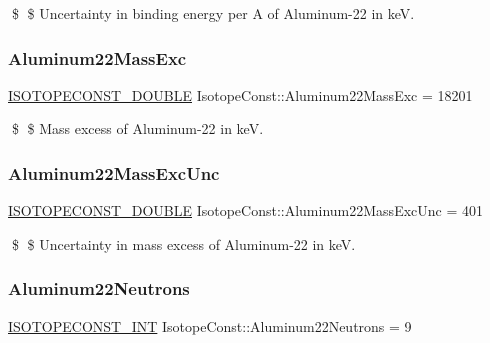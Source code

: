 \$ \$ Uncertainty in binding energy per A of Aluminum-\/22 in keV. \mbox{\label{group___isotope_const-_aluminum-_al22_gac7ff9cd15272c76971142484cd2c50c3}} 
\subsubsection{\texorpdfstring{Aluminum22\+Mass\+Exc}{Aluminum22MassExc}}
{\footnotesize\ttfamily \mbox{\hyperlink{group___isotope_const-_macros_ga8f45a7272ce02c0b4c65c44636ed719a}{I\+S\+O\+T\+O\+P\+E\+C\+O\+N\+S\+T\+\_\+\+D\+O\+U\+B\+LE}} Isotope\+Const\+::\+Aluminum22\+Mass\+Exc = 18201}

\$ \$ Mass excess of Aluminum-\/22 in keV. \mbox{\label{group___isotope_const-_aluminum-_al22_ga56b96e058b9d9135a37dee562cecb729}} 
\subsubsection{\texorpdfstring{Aluminum22\+Mass\+Exc\+Unc}{Aluminum22MassExcUnc}}
{\footnotesize\ttfamily \mbox{\hyperlink{group___isotope_const-_macros_ga8f45a7272ce02c0b4c65c44636ed719a}{I\+S\+O\+T\+O\+P\+E\+C\+O\+N\+S\+T\+\_\+\+D\+O\+U\+B\+LE}} Isotope\+Const\+::\+Aluminum22\+Mass\+Exc\+Unc = 401}

\$ \$ Uncertainty in mass excess of Aluminum-\/22 in keV. \mbox{\label{group___isotope_const-_aluminum-_al22_ga5ed4843eaf0eff6fdc95169f214cbafd}} 
\subsubsection{\texorpdfstring{Aluminum22\+Neutrons}{Aluminum22Neutrons}}
{\footnotesize\ttfamily \mbox{\hyperlink{group___isotope_const-_macros_ga5f18360b3e99483a35c32d789e62621c}{I\+S\+O\+T\+O\+P\+E\+C\+O\+N\+S\+T\+\_\+\+I\+NT}} Isotope\+Const\+::\+Aluminum22\+Neutrons = 9}

